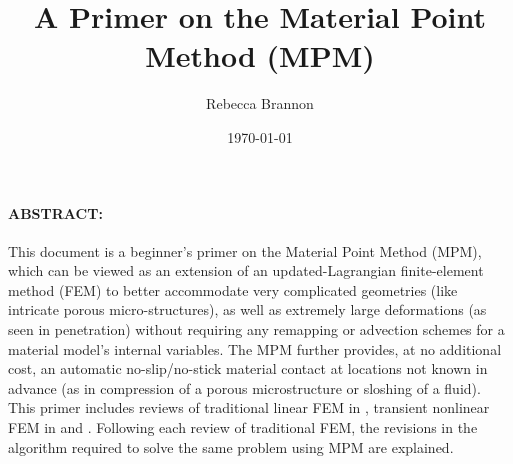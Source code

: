 





\title{A Primer on the Material Point Method (MPM)}
\author{Rebecca Brannon}
\date{\mydate\today}
\begin{minipage}[h]{\textwidth}
    \maketitle
\end{minipage}
\vspace{1cm}

\begin{MyAbstract}
\paragraph{ABSTRACT:}
This document is a beginner's primer on the Material Point Method (MPM), which can be viewed as an extension of an updated-Lagrangian finite-element method (FEM) to better accommodate very complicated geometries (like intricate porous micro-structures), as well as extremely large deformations (as seen in penetration) without requiring any remapping or advection schemes for a material model's internal variables. The MPM further provides, at no additional cost, an automatic no-slip/no-stick material contact at locations not known in advance (as in compression of a porous microstructure or sloshing of a fluid).  This primer includes reviews of traditional linear FEM in \oneD, transient nonlinear FEM in \oneD and \twoD.  Following each review of traditional FEM, the revisions in the algorithm required to solve the same problem using MPM are explained.

\end{MyAbstract}






\begin{comment}
\begin{acknowledgements}
The need to write this primer became clear in August 2013, when Steve Schmidt, as student in the Computational Solid Mechanics (CSM) group at the University of Utah asked a well-known MPM researcher, Jim Guilkey, if there were any good books about the MPM.  Jim replied that he was not aware of any good books on this topic. After a pause, he added ``at least there aren't any bad books on MPM either.'' A few minutes later, Steve sent Jim a screenshot of a book advertised by Barnes and Nobel booksellers under the title ``The Material Point Method.''  Within minutes, we realized that the two Russian ``authors'' were known to farm Wikipedia to create ``books'' that they didn't write themselves.  Therefore, thanks go to Barnes and Nobel for their failure to filter out this sort of sleazy publishing, prompting us to try writing an MPM book!
\end{acknowledgements}
\end{comment}

